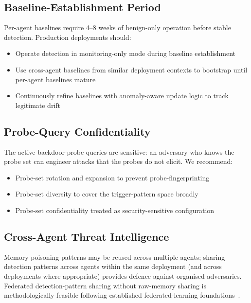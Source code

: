\documentclass[sigconf,nonacm]{acmart}
\begin{document}
\subsection{Baseline-Establishment Period}

Per-agent baselines require 4--8 weeks of benign-only operation
before stable detection. Production deployments should:

\begin{itemize}
  \item Operate detection in monitoring-only mode during baseline
        establishment
  \item Use cross-agent baselines from similar deployment contexts
        to bootstrap until per-agent baselines mature
  \item Continuously refine baselines with anomaly-aware update
        logic to track legitimate drift
\end{itemize}

\subsection{Probe-Query Confidentiality}

The active backdoor-probe queries are sensitive: an adversary who
knows the probe set can engineer attacks that the probes do not
elicit. We recommend:

\begin{itemize}
  \item Probe-set rotation and expansion to prevent
        probe-fingerprinting
  \item Probe-set diversity to cover the trigger-pattern space
        broadly
  \item Probe-set confidentiality treated as security-sensitive
        configuration
\end{itemize}

\subsection{Cross-Agent Threat Intelligence}

Memory poisoning patterns may be reused across multiple agents;
sharing detection patterns across agents within the same
deployment (and across deployments where appropriate) provides
defence against organised adversaries. Federated detection-pattern
sharing without raw-memory sharing is methodologically feasible
following established federated-learning
foundations~\cite{kairouz2024fedml}.
\end{document}
